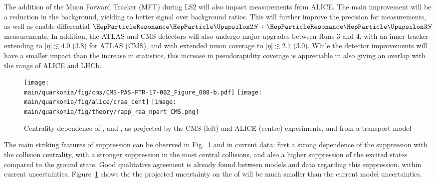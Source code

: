 \documentclass[../report.tex]{subfiles}
\providecommand{\main}{..}
\begin{document}
The addition of the Muon Forward Tracker (MFT) during LS2 will also impact \PGU measurements from ALICE. The main improvement will be a reduction in the background, yielding to better signal over background
ratios. This will further improve the precision for  measurements, as well as enable differential $\PGUP{2S}+\PGUP{3S}$ measurements.
In addition, the ATLAS and CMS detectors will also undergo major upgrades between Runs 3 and 4, with an inner tracker
extending to $|\eta|\lesssim 4.0$ (3.8) for ATLAS (CMS), and with extended muon coverage to $|\eta|\lesssim 2.7$ (3.0). While the detector improvements will have a smaller impact than the
increase in statistics, this increase in pseudorapidity coverage is appreciable in also giving an overlap with the range of ALICE and LHCb.


\begin{figure}
\begin{center}
 \texttt{[image: \\main/quarkonia/fig/cms/CMS-PAS-FTR-17-002\_Figure\_008-b.pdf]}
 \texttt{[image: \\main/quarkonia/fig/alice/craa\_cent]}
 \texttt{[image: \\main/quarkonia/fig/theory/rapp\_raa\_npart\_CMS.png]}
\end{center}

 \caption{Centrality dependence of ,  and  \raa, as projected by the CMS\cite{CMS-PAS-FTR-17-002,Krouppa:2016jcl} (left) and ALICE (centre) experiments, and from a transport model\cite{Du:2017qkv}}
 \label{fig:upsi_raa_npart}
\end{figure}

% 


The main striking features of \PGU suppression can be observed in Fig.~\ref{fig:upsi_raa_npart} and in current data: first a strong dependence of the suppression with the collision
centrality, with a stronger suppression in the most central collisions, and also a higher suppression of the excited states compared to the ground state. Good qualitative agreement
is already found between models and data regarding this suppression, within current uncertainties. Figure~\ref{fig:upsi_raa_npart} shows the the projected uncertainty on the \raa of  will be much smaller than the current model uncertainties.
\end{document}
